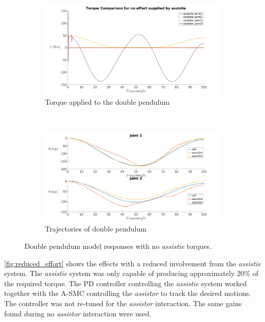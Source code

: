 \begin{figure}[h!]
    \centering
    \begin{subfigure}{0.5\textwidth}
        \centering
        \includegraphics[width=\linewidth]{images/controllers/none_torque.png}
        \caption[Double Pendulum: No Torque-Effort]{Torque applied to the double pendulum}
        \label{fig:no_effort_torque}
    \end{subfigure}%
    ~
    \begin{subfigure}{0.5\textwidth}
        \centering
        \includegraphics[width=\linewidth]{images/controllers/none_traj.png}
        \caption[Double Pendulum: No Torque-Trajectory]{Trajectories of double pendulum}
        \label{fig:no_effort_traj}
    \end{subfigure}
    \caption[Double Pendulum: No Torque]{Double pendulum model responses with no \textit{assistie} torques.}
    \label{fig:no_effort}
\end{figure}

\autoref{fig:reduced_effort} shows the effects with a reduced involvement from the \textit{assistie} system. The \textit{assistie} system was only capable of producing approximately 20\%  of the required torque. The PD controller controlling the \textit{assistie} system worked together with the A-SMC controlling the \textit{assistor} to track the desired motions. The controller was not re-tuned for the \textit{assistor} interaction. The same gains found during no \textit{assistor} interaction were used. 

